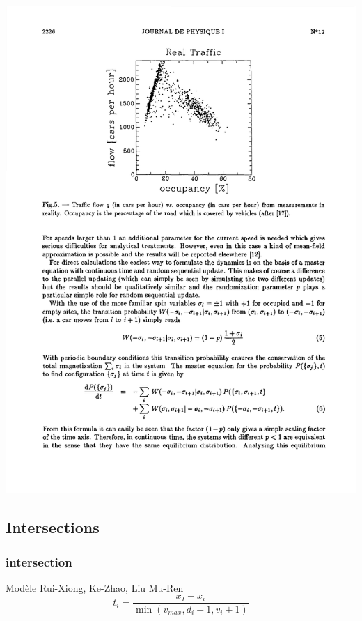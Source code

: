 \documentclass[slidetop,11pt]{beamer}
\begin{document}
\begin{frame}
\includegraphics[scale = 0.7]{dfondcompre}
\end{frame}

\subsection{Intersections}
\begin{frame}
	\frametitle{intersection}
	Modèle Rui-Xiong, Ke-Zhao, Liu Mu-Ren
		\begin{equation}
			t_i = \frac{x_I - x_i}{\min(v_{max},d_i-1,v_i+1)}
		\end{equation}
\end{frame}
\end{document}
